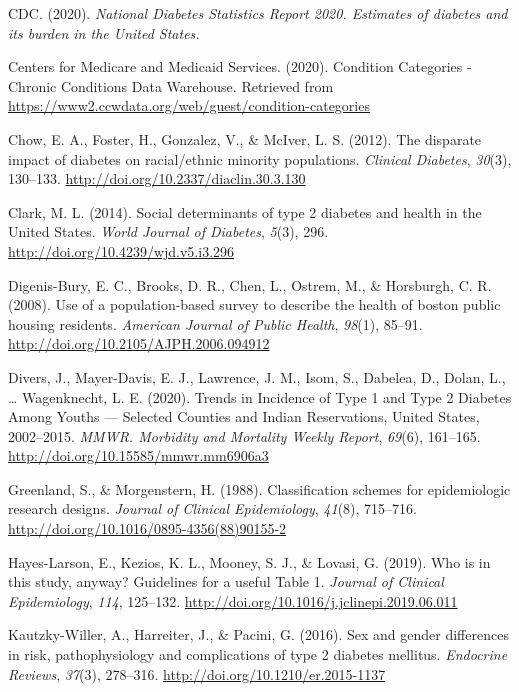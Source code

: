\documentclass [11pt, proquest] {uwthesis}[2015/03/03]
\begin{document}
\hypertarget{ref-CDC2020}{}
CDC. (2020). \emph{National Diabetes Statistics Report 2020. Estimates
of diabetes and its burden in the United States.}

\hypertarget{ref-CMS2020}{}
Centers for Medicare and Medicaid Services. (2020). Condition Categories
- Chronic Conditions Data Warehouse. Retrieved from
\url{https://www2.ccwdata.org/web/guest/condition-categories}

\hypertarget{ref-Chow2012}{}
Chow, E. A., Foster, H., Gonzalez, V., \& McIver, L. S. (2012). The
disparate impact of diabetes on racial/ethnic minority populations.
\emph{Clinical Diabetes}, \emph{30}(3), 130--133.
\url{http://doi.org/10.2337/diaclin.30.3.130}

\hypertarget{ref-Clark2014}{}
Clark, M. L. (2014). Social determinants of type 2 diabetes and health
in the United States. \emph{World Journal of Diabetes}, \emph{5}(3),
296. \url{http://doi.org/10.4239/wjd.v5.i3.296}

\hypertarget{ref-Digenis-Bury2008}{}
Digenis-Bury, E. C., Brooks, D. R., Chen, L., Ostrem, M., \& Horsburgh,
C. R. (2008). Use of a population-based survey to describe the health of
boston public housing residents. \emph{American Journal of Public
Health}, \emph{98}(1), 85--91.
\url{http://doi.org/10.2105/AJPH.2006.094912}

\hypertarget{ref-Divers2020}{}
Divers, J., Mayer-Davis, E. J., Lawrence, J. M., Isom, S., Dabelea, D.,
Dolan, L., \ldots{} Wagenknecht, L. E. (2020). Trends in Incidence of
Type 1 and Type 2 Diabetes Among Youths --- Selected Counties and Indian
Reservations, United States, 2002--2015. \emph{MMWR. Morbidity and
Mortality Weekly Report}, \emph{69}(6), 161--165.
\url{http://doi.org/10.15585/mmwr.mm6906a3}

\hypertarget{ref-Greenland1988}{}
Greenland, S., \& Morgenstern, H. (1988). Classification schemes for
epidemiologic research designs. \emph{Journal of Clinical Epidemiology},
\emph{41}(8), 715--716.
\url{http://doi.org/10.1016/0895-4356(88)90155-2}

\hypertarget{ref-Hayes-Larson2019}{}
Hayes-Larson, E., Kezios, K. L., Mooney, S. J., \& Lovasi, G. (2019).
Who is in this study, anyway? Guidelines for a useful Table 1.
\emph{Journal of Clinical Epidemiology}, \emph{114}, 125--132.
\url{http://doi.org/10.1016/j.jclinepi.2019.06.011}

\hypertarget{ref-Kautzky-Willer2016}{}
Kautzky-Willer, A., Harreiter, J., \& Pacini, G. (2016). Sex and gender
differences in risk, pathophysiology and complications of type 2
diabetes mellitus. \emph{Endocrine Reviews}, \emph{37}(3), 278--316.
\url{http://doi.org/10.1210/er.2015-1137}
\end{document}
